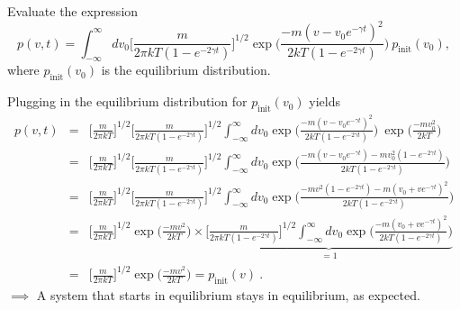 Evaluate the expression
\begin{equation}
p(v, t) = \int_{-\infty}^{\infty} d v_0 \bigg[\frac{m}{2\pi k T (1-e^{-2\gamma t})}\bigg]^{1/2} \exp\bigg(\frac{-m(v-v_0 e^{-\gamma t})^2}{2 k T (1-e^{-2\gamma t})}\bigg)~p_\text{init}(v_0),
\end{equation}
where $p_\text{init}(v_0)$ is the equilibrium distribution. 

Plugging in the equilibrium distribution for $p_\text{init}(v_0)$ yields
\begin{eqnarray}
p(v, t) &=& \bigg[\frac{m}{2\pi k T}\bigg]^{1/2} \bigg[\frac{m}{2\pi k T (1-e^{-2\gamma t})}\bigg]^{1/2}  \int_{-\infty}^{\infty} d v_0 \exp\bigg(\frac{-m(v-v_0 e^{-\gamma t})^2}{2 k T (1-e^{-2\gamma t})}\bigg)~\exp\bigg(\frac{-mv_0^2}{2 k T} \bigg) \nonumber \\
&=& \bigg[\frac{m}{2\pi k T}\bigg]^{1/2} \bigg[\frac{m}{2\pi k T (1-e^{-2\gamma t})}\bigg]^{1/2} \int_{-\infty}^{\infty} d v_0 \exp\bigg(\frac{-m(v-v_0 e^{-\gamma t})-m v_0^2 (1-e^{-2\gamma t})}{2 k T (1-e^{-2\gamma t})}\bigg) \nonumber \\
&=& \bigg[\frac{m}{2\pi k T}\bigg]^{1/2} \bigg[\frac{m}{2\pi k T (1-e^{-2\gamma t})}\bigg]^{1/2} \int_{-\infty}^{\infty} d v_0 \exp\bigg(\frac{-mv^2 (1-e^{-2\gamma t})-m (v_0+ve^{-\gamma t})^2}{2 k T (1-e^{-2\gamma t})}\bigg) \nonumber \\
&=& \bigg[\frac{m}{2\pi k T}\bigg]^{1/2} \exp\bigg(\frac{-mv^2}{2 k T}\bigg) \times  \underbrace{\bigg[\frac{m}{2\pi k T (1-e^{-2\gamma t})}\bigg]^{1/2} \int_{-\infty}^{\infty} d v_0 \exp\bigg(\frac{-m (v_0+ve^{-\gamma t})^2}{2 k T (1-e^{-2\gamma t})}\bigg)}_{=1} \nonumber \\
&=& \boxed{\bigg[\frac{m}{2\pi k T}\bigg]^{1/2} \exp\bigg(\frac{-mv^2}{2 k T}\bigg)  = p_\text{init}(v)}~.
\end{eqnarray}
$\implies$ A system that starts in equilibrium stays in equilibrium, as expected.
